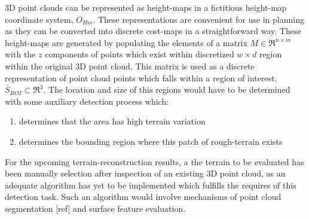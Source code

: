 			3D point clouds can be represented as height-maps in a fictitious height-map coordinate system, $O_{Hm}$. These representations are convenient for use in planning as they can be converted into discrete cost-maps in a straightforward way. These height-maps are generated by populating the elements of a matrix  $M\in \Re^{n\times m}$ with the $z$ components of points which exist within discretized $w\times d$ region within the original 3D point cloud. This matrix is used as a discrete representation of point cloud points which falls within a region of interest, $\bar{S}_{ROI}\subset\Re^{3}$. The location and size of this regions would have to be determined with some auxiliary detection process which:
			\begin{enumerate}
				\item determines that the area has high terrain variation
				\item determines the bounding region where this patch of rough-terrain exists
			\end{enumerate}
			For the upcoming terrain-reconstruction results, a the terrain to be evaluated has been manually selection after inspection of an existing 3D point cloud, as an adequate algorithm has yet to be implemented which fulfills the requires of this detection task. Such an algorithm would involve mechanisms of point cloud segmentation [ref] and surface feature evaluation.

